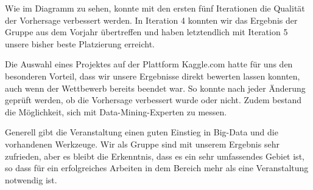 Wie im Diagramm zu sehen, konnte mit den ersten fünf Iterationen die Qualität der Vorhersage verbessert werden. In Iteration 4 konnten wir das Ergebnis der Gruppe aus dem Vorjahr übertreffen und haben letztendlich mit Iteration 5 unsere bisher beste Platzierung erreicht.

Die Auswahl eines Projektes auf der Plattform Kaggle.com hatte für uns den besonderen Vorteil, dass wir unsere Ergebnisse direkt bewerten lassen konnten, auch wenn der Wettbewerb bereits beendet war. So konnte nach jeder Änderung geprüft werden, ob die Vorhersage verbessert wurde oder nicht. Zudem bestand die Möglichkeit, sich mit Data-Mining-Experten zu messen.

Generell gibt die Veranstaltung einen guten Einstieg in Big-Data und die vorhandenen Werkzeuge. Wir als Gruppe sind mit unserem Ergebnis sehr zufrieden, aber es bleibt die Erkenntnis, dass es ein sehr umfassendes Gebiet ist, so dass für ein erfolgreiches Arbeiten in dem Bereich mehr als eine Veranstaltung notwendig ist.
